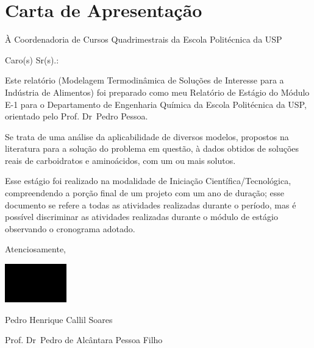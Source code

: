 \chapter*{Carta de Apresentação}

À Coordenadoria de Cursos Quadrimestrais da Escola Politécnica da USP

Caro(s) Sr(s).:

\par Este relatório (Modelagem Termodinâmica de Soluções de Interesse para a
Indústria de Alimentos) foi preparado como meu Relatório de Estágio do Módulo
E-1 para o Departamento de Engenharia Química da Escola Politécnica da USP,
orientado pelo Prof\textordmasculine. Dr\textordmasculine\ Pedro Pessoa.

Se trata de uma análise da aplicabilidade de diversos modelos, propostos na
literatura para a solução do problema em questão, à dados obtidos de soluções
reais de carboidratos e aminoácidos, com um ou mais solutos.

Esse estágio foi realizado na modalidade de Iniciação Científica/Tecnológica,
compreendendo a porção final de um projeto com um ano de duração; esse documento
se refere a todas as atividades realizadas durante o período, mas é possível
discriminar as atividades realizadas durante o módulo de estágio observando
o cronograma adotado.

Atenciosamente,

\includegraphics[width=0.2\textwidth]{signature.png}

Pedro Henrique Callil Soares

\vspace{100px}

Prof\textordmasculine. Dr\textordmasculine\ Pedro de Alcântara Pessoa Filho

\newpage
